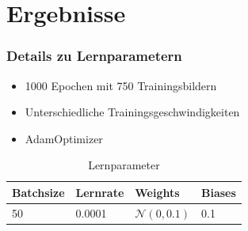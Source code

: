 \documentclass{beamer}
\begin{document}
\section{Ergebnisse}
\begin{frame}
	\frametitle{Details zu Lernparametern}
	\begin{itemize} 		
		\item 1000 Epochen mit 750 Trainingsbildern
		\item Unterschiedliche Trainingsgeschwindigkeiten
		\item AdamOptimizer
	\end{itemize}
	\begin{table}
		\begin{tabular}{l l l l}
			\toprule
			\textbf{Batchsize} & \textbf{Lernrate} & \textbf{Weights} & \textbf{Biases}\\
			\midrule
			50 &  0.0001 & \( \mathcal{N}(0,0.1) \) & 0.1\\
			
			\bottomrule
		\end{tabular}
		\caption{Lernparameter}
	\end{table}
\end{frame}
\end{document}
